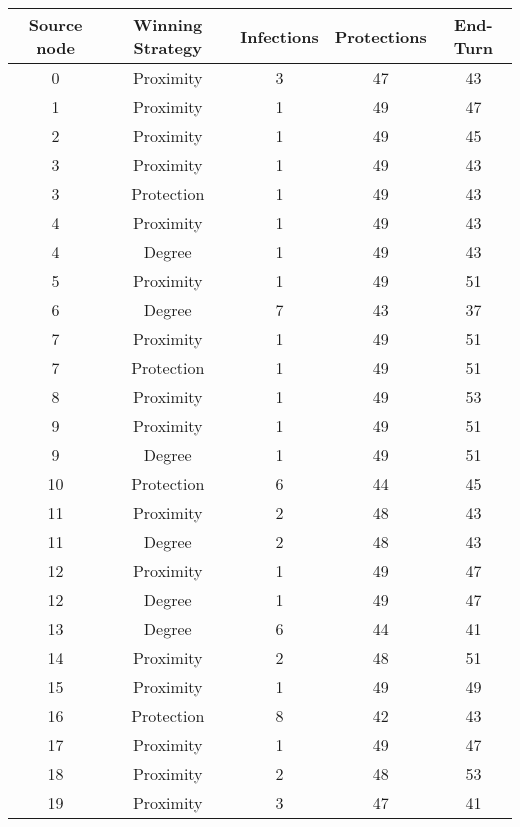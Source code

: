 \documentclass[results.tex]{subfiles}
\begin{document}
\begin{center}
  \begin{tabular}{| c || c | c | c | c |}
    \hline
    {\bfseries Source node} & {\bfseries Winning Strategy} & {\bfseries Infections} & {\bfseries Protections} & {\bfseries End-Turn} \\  %
    \hline\hline
    0 & Proximity & 3 & 47 & 43 \\ 
    \hline
    1 & Proximity & 1 & 49 & 47 \\ 
    \hline
    2 & Proximity & 1 & 49 & 45 \\ 
    \hline
    3 & Proximity & 1 & 49 & 43 \\ 
    \hline
    3 & Protection & 1 & 49 & 43 \\ 
    \hline
    4 & Proximity & 1 & 49 & 43 \\ 
    \hline
    4 & Degree & 1 & 49 & 43 \\ 
    \hline
    5 & Proximity & 1 & 49 & 51 \\ 
    \hline
    6 & Degree & 7 & 43 & 37 \\ 
    \hline
    7 & Proximity & 1 & 49 & 51 \\ 
    \hline
    7 & Protection & 1 & 49 & 51 \\ 
    \hline
    8 & Proximity & 1 & 49 & 53 \\ 
    \hline
    9 & Proximity & 1 & 49 & 51 \\ 
    \hline
    9 & Degree & 1 & 49 & 51 \\ 
    \hline
    10 & Protection & 6 & 44 & 45 \\ 
    \hline
    11 & Proximity & 2 & 48 & 43 \\ 
    \hline
    11 & Degree & 2 & 48 & 43 \\ 
    \hline
    12 & Proximity & 1 & 49 & 47 \\ 
    \hline
    12 & Degree & 1 & 49 & 47 \\ 
    \hline
    13 & Degree & 6 & 44 & 41 \\ 
    \hline
    14 & Proximity & 2 & 48 & 51 \\ 
    \hline
    15 & Proximity & 1 & 49 & 49 \\ 
    \hline
    16 & Protection & 8 & 42 & 43 \\ 
    \hline
    17 & Proximity & 1 & 49 & 47 \\ 
    \hline
    18 & Proximity & 2 & 48 & 53 \\ 
    \hline
    19 & Proximity & 3 & 47 & 41 \\ 

\end{tabular}
\end{center}
\end{document}
